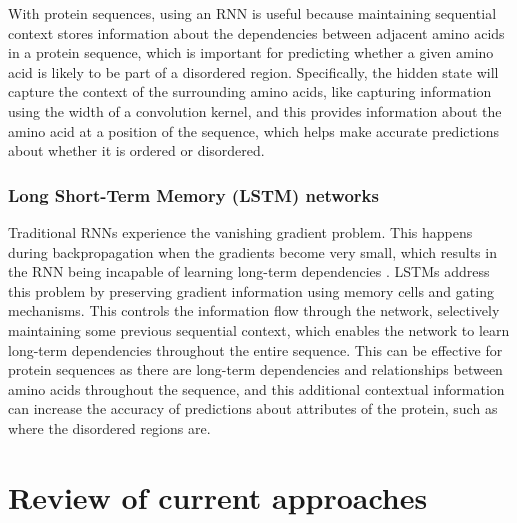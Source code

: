 \documentclass{l4proj}
\begin{document}
With protein sequences, using an RNN is useful because maintaining sequential context stores information about the dependencies between adjacent amino acids in a protein sequence, which is important for predicting whether a given amino acid is likely to be part of a disordered region. Specifically, the hidden state will capture the context of the surrounding amino acids, like capturing information using the width of a convolution kernel, and this provides information about the amino acid at a position of the sequence, which helps make accurate predictions about whether it is ordered or disordered. \\

\subsubsection{Long Short-Term Memory (LSTM) networks \newline}

Traditional RNNs experience the vanishing gradient problem. This happens during backpropagation when the gradients become very small, which results in the RNN being incapable of learning long-term dependencies \citep{Arbel:18}. LSTMs address this problem by preserving gradient information using memory cells and gating mechanisms. This controls the information flow through the network, selectively maintaining some previous sequential context, which enables the network to learn long-term dependencies throughout the entire sequence. This can be effective for protein sequences as there are long-term dependencies and relationships between amino acids throughout the sequence, and this additional contextual information can increase the accuracy of predictions about attributes of the protein, such as where the disordered regions are.

\section{Review of current approaches}
\label{sec:current approaches}
\end{document}

